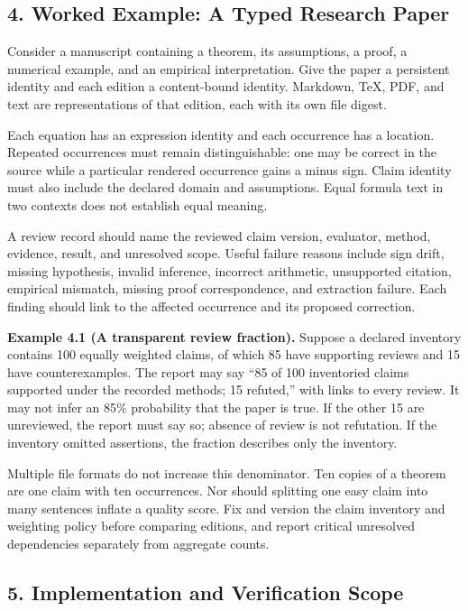 \documentclass[
  10pt,
]{article}
\begin{document}
\subsection{4. Worked Example: A Typed Research Paper}\label{worked-example-a-typed-research-paper}

Consider a manuscript containing a theorem, its assumptions, a proof, a numerical example, and an empirical interpretation. Give the paper a persistent identity and each edition a content-bound identity. Markdown, TeX, PDF, and text are representations of that edition, each with its own file digest.

Each equation has an expression identity and each occurrence has a location. Repeated occurrences must remain distinguishable: one may be correct in the source while a particular rendered occurrence gains a minus sign. Claim identity must also include the declared domain and assumptions. Equal formula text in two contexts does not establish equal meaning.

A review record should name the reviewed claim version, evaluator, method, evidence, result, and unresolved scope. Useful failure reasons include sign drift, missing hypothesis, invalid inference, incorrect arithmetic, unsupported citation, empirical mismatch, missing proof correspondence, and extraction failure. Each finding should link to the affected occurrence and its proposed correction.

\textbf{Example 4.1 (A transparent review fraction).} Suppose a declared inventory contains 100 equally weighted claims, of which 85 have supporting reviews and 15 have counterexamples. The report may say ``85 of 100 inventoried claims supported under the recorded methods; 15 refuted,'' with links to every review. It may not infer an 85\% probability that the paper is true. If the other 15 are unreviewed, the report must say so; absence of review is not refutation. If the inventory omitted assertions, the fraction describes only the inventory.

Multiple file formats do not increase this denominator. Ten copies of a theorem are one claim with ten occurrences. Nor should splitting one easy claim into many sentences inflate a quality score. Fix and version the claim inventory and weighting policy before comparing editions, and report critical unresolved dependencies separately from aggregate counts.

\subsection{5. Implementation and Verification Scope}\label{implementation-and-verification-scope}
\end{document}
